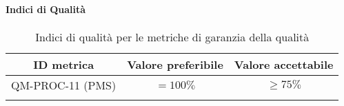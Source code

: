	
	\paragraph{Indici di Qualità}
	
	\begin{center}
		\begin{longtable}{|c|c|c|}
			\hline
			\rowcolor{lighter-grayer}
			\textbf{ID metrica} & \textbf{Valore preferibile} & \textbf{Valore accettabile}\\
			\hline
			\endfirsthead
			\hline
			QM-PROC-11 (PMS) & \(= 100\%\) & \(\geq 75\%\) \\ \hline
			\hline
			\caption{Indici di qualità per le metriche di garanzia della qualità}
		\end{longtable}
	\end{center}